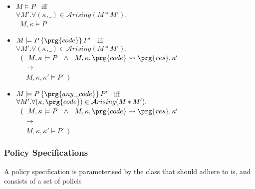 {\begin{definition}[Policies]
\begin{itemize}
\item
$M  \models P$   \  iff \\ 
$ \forall M'.\forall ( \kappa,\_ )\in {\mathcal{A}rising}(M*M').$
  \\ 
  $ ~ $   \hspace{.2in} 
$ M, \kappa \models P$
\item
$M  \models P\, \{ \prg{code} \}\, P'$ \  iff \\ 
 $\forall M'. \forall (\kappa,\_ )\in {\mathcal{A}rising}(M*M').$\\
 $ ~ $ \hspace{.2in} 
 $(\ \ M, \kappa \models P\ \ \wedge\  \ M, \kappa, \prg{code}  \leadsto \prg{res}, \kappa' $ \\
  $ ~ $   \hspace{.6in}  $ \ \ \  \longrightarrow $\\
  $ ~ $   \hspace{.2in}  $  \ \ \ \ M, \kappa, \kappa' \models P'\ \ )$
\item
$M  \models P\, \{ \prg{any\_code} \}\,  P'  $ \  iff \\ 
 $\forall M'. \forall (\kappa,\prg{code} )\in {\mathcal{A}rising}(M*M').$\\  $ ~ $ \hspace{.2in} 
 $(\ \ M, \kappa \models P\ \ \wedge\  \ M, \kappa, \prg{code}  \leadsto \prg{res}, \kappa' $ \\
  $ ~ $   \hspace{.6in}  $ \ \ \  \longrightarrow $\\
  $ ~ $   \hspace{.2in}  $  \ \ \ \ M, \kappa, \kappa' \models P'\ \ )$
\end{itemize}
\end{definition}


\subsubsection{Policy Specifications}

A policy specification is parameterised by the class that should adhere to is, and consists of a set of policis

\begin{definition}
$ $ \\


\end{definition}}
